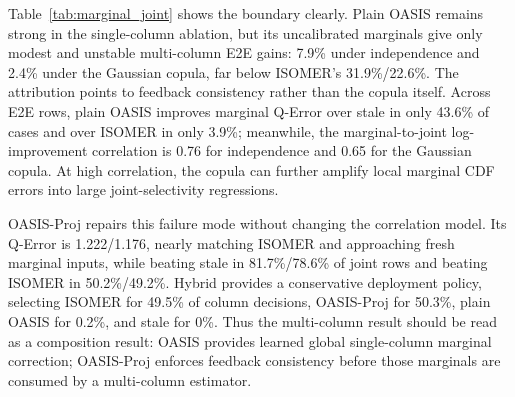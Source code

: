 \documentclass[runningheads]{llncs}
\begin{document}
\begin{table}[t]
  \centering
  \small
  \caption{Marginal-to-joint composition: average Q-Error ($\downarrow$) for two-column range predicates. Values average the configuration-level geometric means over 20 correlation/drift settings. OASIS-Proj is a feedback-consistency calibration layer on top of OASIS marginals; Hybrid uses only feedback-window residuals for selection.}
  \label{tab:marginal_joint}
  \setlength{\tabcolsep}{4pt}
\end{table}

Table~\ref{tab:marginal_joint} shows the boundary clearly. Plain OASIS remains strong in the single-column ablation, but its uncalibrated marginals give only modest and unstable multi-column E2E gains: 7.9\% under independence and 2.4\% under the Gaussian copula, far below ISOMER's 31.9\%/22.6\%. The attribution points to feedback consistency rather than the copula itself. Across E2E rows, plain OASIS improves marginal Q-Error over stale in only 43.6\% of cases and over ISOMER in only 3.9\%; meanwhile, the marginal-to-joint log-improvement correlation is 0.76 for independence and 0.65 for the Gaussian copula. At high correlation, the copula can further amplify local marginal CDF errors into large joint-selectivity regressions.

OASIS-Proj repairs this failure mode without changing the correlation model. Its Q-Error is 1.222/1.176, nearly matching ISOMER and approaching fresh marginal inputs, while beating stale in 81.7\%/78.6\% of joint rows and beating ISOMER in 50.2\%/49.2\%. Hybrid provides a conservative deployment policy, selecting ISOMER for 49.5\% of column decisions, OASIS-Proj for 50.3\%, plain OASIS for 0.2\%, and stale for 0\%. Thus the multi-column result should be read as a composition result: OASIS provides learned global single-column marginal correction; OASIS-Proj enforces feedback consistency before those marginals are consumed by a multi-column estimator.
\end{document}
